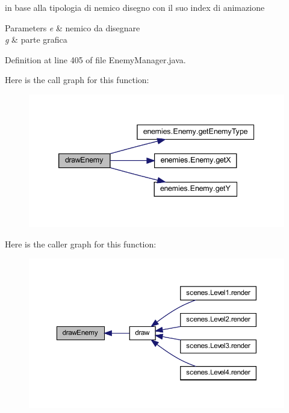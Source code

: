 in base alla tipologia di nemico disegno con il suo index di animazione 


\begin{DoxyParams}{Parameters}
{\em e} & nemico da disegnare \\
\hline
{\em g} & parte grafica \\
\hline
\end{DoxyParams}


Definition at line 405 of file Enemy\+Manager.\+java.

Here is the call graph for this function\+:\nopagebreak
\begin{figure}[H]
\begin{center}
\leavevmode
\includegraphics[width=339pt]{classmanagers_1_1_enemy_manager_a7ebdd9acefa4682b23b1ad2c0be558f4_cgraph}
\end{center}
\end{figure}
Here is the caller graph for this function\+:
\nopagebreak
\begin{figure}[H]
\begin{center}
\leavevmode
\includegraphics[width=350pt]{classmanagers_1_1_enemy_manager_a7ebdd9acefa4682b23b1ad2c0be558f4_icgraph}
\end{center}
\end{figure}
\mbox{\label{classmanagers_1_1_enemy_manager_a9c98cd29298e5f583c52dc46a6d70d46}} 
